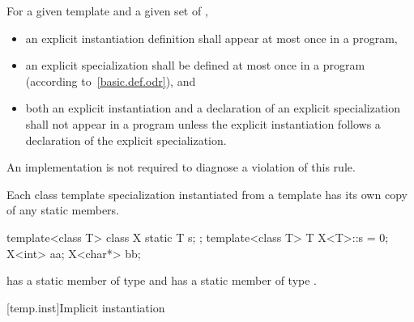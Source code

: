 \pnum
For a given template and a given set of
,
\begin{itemize}
\item
an explicit instantiation definition shall appear at most once in a program,
\item
an explicit specialization shall be defined at most once
in a program (according to~\ref{basic.def.odr}), and
\item
both an explicit instantiation and a declaration of an
explicit specialization shall not appear in a program unless
the explicit instantiation follows a declaration of the explicit
specialization.
\end{itemize}
An implementation is not required to diagnose a violation of this rule.

\pnum
Each class template specialization instantiated from a template has its own
copy of any static members.
\enterexample

\begin{codeblock}
template<class T> class X {
  static T s;
};
template<class T> T X<T>::s = 0;
X<int> aa;
X<char*> bb;
\end{codeblock}

has a static member
of type
and
has a static member
of type
.
\exitexample

[temp.inst]{Implicit instantiation}


